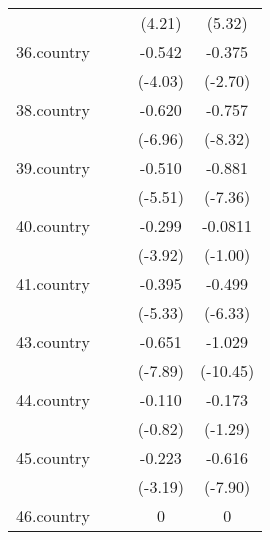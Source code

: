 {\begin{tabular}{l*{4}{c}}
            &                     &                     &      (4.21)         &      (5.32)         \\
[1em]
36.country  &                     &                     &      -0.542\sym{***}&      -0.375\sym{**} \\
            &                     &                     &     (-4.03)         &     (-2.70)         \\
[1em]
38.country  &                     &                     &      -0.620\sym{***}&      -0.757\sym{***}\\
            &                     &                     &     (-6.96)         &     (-8.32)         \\
[1em]
39.country  &                     &                     &      -0.510\sym{***}&      -0.881\sym{***}\\
            &                     &                     &     (-5.51)         &     (-7.36)         \\
[1em]
40.country  &                     &                     &      -0.299\sym{***}&     -0.0811         \\
            &                     &                     &     (-3.92)         &     (-1.00)         \\
[1em]
41.country  &                     &                     &      -0.395\sym{***}&      -0.499\sym{***}\\
            &                     &                     &     (-5.33)         &     (-6.33)         \\
[1em]
43.country  &                     &                     &      -0.651\sym{***}&      -1.029\sym{***}\\
            &                     &                     &     (-7.89)         &    (-10.45)         \\
[1em]
44.country  &                     &                     &      -0.110         &      -0.173         \\
            &                     &                     &     (-0.82)         &     (-1.29)         \\
[1em]
45.country  &                     &                     &      -0.223\sym{**} &      -0.616\sym{***}\\
            &                     &                     &     (-3.19)         &     (-7.90)         \\
[1em]
46.country  &                     &                     &           0         &           0         \\

\end{tabular}}
